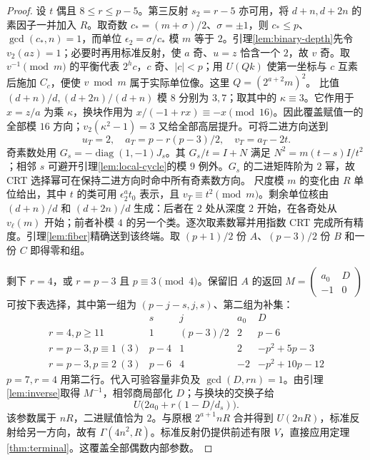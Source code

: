 \documentclass[11pt,a4paper]{article}
\newcommand{\diag}{\operatorname{diag}}
\theoremstyle{definition}
\numberwithin{equation}{section}
\begin{document}
\begin{proof}
设 $t$ 偶且 $8\le r\le p-5$。第三反射 $s_2=r-5$ 亦可用，将 $d+n,d+2n$ 的素因子一并加入 $R$。取奇数 $c_*=(m+\sigma)/2$、$\sigma=\pm1$，则 $c_*\le p$、$\gcd(c_*,n)=1$，而单位 $\epsilon_2=\sigma/c_*$ 模 $m$ 等于 $2$。引理\ref{lem:binary-depth}先令 $v_2(az)=1$；必要时再用标准反射，使 $a$ 奇、$u=z$ 恰含一个 $2$，故 $v$ 奇。取 $v^{-1}\pmod m$ 的平衡代表 $2^h c$，$c$ 奇、$|c|<p$；用 $U(Qk)$ 使第一坐标与 $c$ 互素后施加 $C_c$，便使 $v\bmod m$ 属于实际单位像。这里 $Q=(2^{a+2}m)^2$。
比值 $(d+n)/d,(d+2n)/(d+n)$ 模 $8$ 分别为 $3,7$；取其中的 $\kappa\equiv3$。它作用于 $x=z/a$ 为乘 $\kappa$，换块作用为 $x/(-1+rx)\equiv-x\pmod{16}$。因此覆盖赋值一的全部模 $16$ 方向；$v_2(\kappa^2-1)=3$ 又给全部高层提升。可将二进方向送到
\[
u_T=2,\quad a_T=p-r(p-3)/2,\quad v_T=a_T-2t.
\]
奇素数处用 $G_s=-\diag(1,-1)J_s$。其 $G_s/t=I+N$ 满足 $N^2=m(t-s)I/t^2$；相邻 $s$ 可避开引理\ref{lem:local-cycle}的模 $9$ 例外。$G_s$ 的二进矩阵阶为 $2$ 幂，故 CRT 选择幂可在保持二进方向时命中所有奇素数方向。
尺度模 $m$ 的变化由 $R$ 单位给出，其中 $t$ 的类可用 $\epsilon_2^a t_0$ 表示，且 $v_T\equiv t^2\pmod m$。剩余单位核由 $(d+n)/d$ 和 $(d+2n)/d$ 生成：后者在 $2$ 处从深度 $2$ 开始，在各奇处从 $v_\ell(m)$ 开始；前者补模 $4$ 的另一个类。逐次取素数幂并用指数 CRT 完成所有精度。引理\ref{lem:fiber}精确送到该终端。取 $(p+1)/2$ 份 $A$、$(p-3)/2$ 份 $B$ 和一份 $C$ 即得零和组。

剩下 $r=4$，或 $r=p-3$ 且 $p\equiv3\pmod4$。保留旧 $A$ 的返回 $M=\left(\begin{smallmatrix}a_0&D\\-1&0\end{smallmatrix}\right)$ 可按下表选择，其中第一组为 $(p-j-s,j,s)$、第二组为补集：
\[
\begin{array}{c|rrrr}
&s&j&a_0&D\\\hline
r=4,p\ge11&1&(p-3)/2&2&p-6\\
r=p-3,p\equiv1\ (3)&p-4&1&2&-p^2+5p-3\\
r=p-3,p\equiv2\ (3)&p-6&4&-2&-p^2+10p-12
\end{array}
\]
$p=7,r=4$ 用第二行。代入可验容量非负及 $\gcd(D,rn)=1$。由引理\ref{lem:inverse}取得 $M^{-1}$，相邻商局部化 $D$；与换块的交换子给
\[U\bigl(2a_0+r(1-D/d_s)\bigr).
\]
该参数属于 $nR$，二进赋值恰为 $2$。与原根 $2^{a+1}nR$ 合并得到 $U(2nR)$，标准反射给另一方向，故有 $\Gamma(4n^2,R)$。标准反射仍提供前述有限 $V$，直接应用定理\ref{thm:terminal}。这覆盖全部偶数内部参数。
\end{proof}
\end{document}
